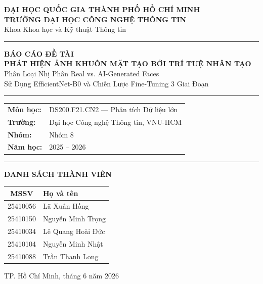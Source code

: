 \documentclass[13pt, a4paper]{report}
\begin{document}
\begin{titlepage}
  \centering
  \vspace*{0.5cm}

  {\large\bfseries ĐẠI HỌC QUỐC GIA THÀNH PHỐ HỒ CHÍ MINH}\\[4pt]
  {\large\bfseries TRƯỜNG ĐẠI HỌC CÔNG NGHỆ THÔNG TIN}\\[4pt]
  {\normalsize Khoa Khoa học và Kỹ thuật Thông tin}

  \vspace{1cm}
  \rule{0.6\linewidth}{2pt}
  \vspace{1cm}

  {\Huge\bfseries\color{uitblue} BÁO CÁO ĐỀ TÀI}\\[12pt]
  {\LARGE\bfseries PHÁT HIỆN ẢNH KHUÔN MẶT TẠO BỞI TRÍ TUỆ NHÂN TẠO}\\[8pt]
  {\large Phân Loại Nhị Phân Real vs. AI-Generated Faces\\
         Sử Dụng EfficientNet-B0 và Chiến Lược Fine-Tuning 3 Giai Đoạn}

  \vspace{1cm}
  \rule{0.6\linewidth}{0.8pt}
  \vspace{1cm}

  \begin{tabular}{ll}
    \textbf{Môn học:}   & DS200.F21.CN2 — Phân tích Dữ liệu lớn \\[4pt]
    \textbf{Trường:}    & Đại học Công nghệ Thông tin, VNU-HCM \\[4pt]
    \textbf{Nhóm:}      & Nhóm 8 \\[4pt]
    \textbf{Năm học:}   & 2025 -- 2026 \\
  \end{tabular}

  \vspace{1cm}
  \rule{0.6\linewidth}{0.8pt}
  \vspace{0.5cm}

  {\large\bfseries DANH SÁCH THÀNH VIÊN}\\[10pt]
  \begin{tabular}{cl}
    \toprule
    \textbf{MSSV} & \textbf{Họ và tên} \\
    \midrule
    25410056 & Lã Xuân Hồng      \\
    25410150 & Nguyễn Minh Trọng \\
    25410034 & Lê Quang Hoài Đức \\
    25410104 & Nguyễn Minh Nhật  \\
    25410088 & Trần Thanh Long   \\
    \bottomrule
  \end{tabular}

  \vfill
  {\small TP. Hồ Chí Minh, tháng 6 năm 2026}
\end{titlepage}
\end{document}
